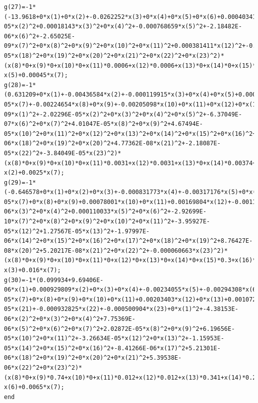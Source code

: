 \documentclass[12pt]{article}%
\begin{document}
\begin{lstlisting}
g(27)=-1*(-13.9618+0*x(1)+0*x(2)+-0.0262252*x(3)+0*x(4)+0*x(5)+0*x(6)+0.000403413*x(7)+0*x(8)+0*x(9)+0*x(10)+0*x(11)+-0.0215884*x(12)+0.0103905*x(13)+0*x(14)+0*x(15)+0*x(16)+0*x(17)+0.0166337*x(18)+0*x(19)+0*x(20)+0*x(21)+0.00314649*x(22)+0*x(23)+0*x(1)^2+3.54233E-05*x(2)^2+0.00018143*x(3)^2+0*x(4)^2+-0.000768659*x(5)^2+-2.18482E-06*x(6)^2+-2.65025E-09*x(7)^2+0*x(8)^2+0*x(9)^2+0*x(10)^2+0*x(11)^2+0.000381411*x(12)^2+-0.000117562*x(13)^2+0*x(14)^2+0*x(15)^2+0*x(16)^2+0*x(17)^2+-9.28869E-05*x(18)^2+0*x(19)^2+0*x(20)^2+0*x(21)^2+0*x(22)^2+0*x(23)^2)*(x(8)*0+x(9)*0+x(10)*0+x(11)*0.0006+x(12)*0.0006+x(13)*0+x(14)*0+x(15)*0+x(16)*0.0018+x(17)*0.0004+x(18)*0.0004+x(19)*0+x(20)*0.0018+x(21)*0.0018+x(22)*0+x(23)*0)-x(5)+0.00045*x(7);
g(28)=-1*(0.631209+0*x(1)+-0.00436584*x(2)+-0.000119915*x(3)+0*x(4)+0*x(5)+0.000185506*x(6)+1.60724E-05*x(7)+-0.00224654*x(8)+0*x(9)+-0.00205098*x(10)+0*x(11)+0*x(12)+0*x(13)+0*x(14)+0*x(15)+-0.00016388*x(16)+0.000446447*x(17)+0.00181601*x(18)+-0.00504081*x(19)+-0.000215367*x(20)+-0.000301199*x(21)+0.00333871*x(22)+0*x(23)+4.69113E-09*x(1)^2+-2.02296E-05*x(2)^2+0*x(3)^2+0*x(4)^2+0*x(5)^2+-6.37049E-07*x(6)^2+0*x(7)^2+4.01047E-05*x(8)^2+0*x(9)^2+4.67494E-05*x(10)^2+0*x(11)^2+0*x(12)^2+0*x(13)^2+0*x(14)^2+0*x(15)^2+0*x(16)^2+0*x(17)^2+-7.78204E-06*x(18)^2+0*x(19)^2+0*x(20)^2+4.77362E-08*x(21)^2+-2.18087E-05*x(22)^2+-3.84049E-05*x(23)^2)*(x(8)*0+x(9)*0+x(10)*0+x(11)*0.0031+x(12)*0.0031+x(13)*0+x(14)*0.00374+x(15)*0+x(16)*0.017+x(17)*0.0006+x(18)*0.0006+x(19)*0.96+x(20)*0.017+x(21)*0.017+x(22)*0.3+x(23)*0.225692308)-x(2)+0.0025*x(7);
g(29)=-1*(-0.646578+0*x(1)+0*x(2)+0*x(3)+-0.000831773*x(4)+-0.00317176*x(5)+0*x(6)+5.30131E-05*x(7)+0*x(8)+0*x(9)+0.00078001*x(10)+0*x(11)+0.00169804*x(12)+-0.00113877*x(13)+0*x(14)+0*x(15)+-0.000401287*x(16)+0*x(17)+0*x(18)+0*x(19)+-0.000598859*x(20)+-0.000537688*x(21)+0*x(22)+0*x(23)+0*x(1)^2+0*x(2)^2+-5.21388E-06*x(3)^2+0*x(4)^2+0.000110033*x(5)^2+0*x(6)^2+-2.92699E-10*x(7)^2+0*x(8)^2+0*x(9)^2+0*x(10)^2+0*x(11)^2+-3.95927E-05*x(12)^2+1.27567E-05*x(13)^2+-1.97997E-06*x(14)^2+0*x(15)^2+0*x(16)^2+0*x(17)^2+0*x(18)^2+0*x(19)^2+8.76427E-08*x(20)^2+5.20217E-08*x(21)^2+0*x(22)^2+-0.000060663*x(23)^2)*(x(8)*0+x(9)*0+x(10)*0+x(11)*0+x(12)*0+x(13)*0+x(14)*0+x(15)*0.3+x(16)*0.664+x(17)*0+x(18)*0+x(19)*0+x(20)*0.664+x(21)*0.664+x(22)*0+x(23)*0)-x(3)+0.016*x(7);
g(30)=-1*(0.099934+9.69406E-06*x(1)+0.000929809*x(2)+0*x(3)+0*x(4)+-0.00234055*x(5)+-0.00294308*x(6)+1.09483E-05*x(7)+0*x(8)+0*x(9)+0*x(10)+0*x(11)+0.00203403*x(12)+0*x(13)+0.00107264*x(14)+0*x(15)+0*x(16)+0*x(17)+-0.00227124*x(18)+0*x(19)+-0.000101107*x(20)+-9.86571E-05*x(21)+-0.000932825*x(22)+-0.000500904*x(23)+0*x(1)^2+-4.38153E-06*x(2)^2+0*x(3)^2+0*x(4)^2+7.75369E-06*x(5)^2+0*x(6)^2+0*x(7)^2+2.02872E-05*x(8)^2+0*x(9)^2+6.19656E-05*x(10)^2+0*x(11)^2+-3.26634E-05*x(12)^2+0*x(13)^2+-1.15953E-05*x(14)^2+0*x(15)^2+0*x(16)^2+-8.41266E-06*x(17)^2+5.21301E-06*x(18)^2+0*x(19)^2+0*x(20)^2+0*x(21)^2+5.39538E-06*x(22)^2+0*x(23)^2)*(x(8)*0+x(9)*0.74+x(10)*0+x(11)*0.012+x(12)*0.012+x(13)*0.341+x(14)*0.285+x(15)*0.3+x(16)*0.072+x(17)*0.767+x(18)*0.767+x(19)*0+x(20)*0.172+x(21)*0.172+x(22)*0.56+x(23)*0.392)-x(6)+0.0065*x(7);
end
 \end{lstlisting}
\end{document}
